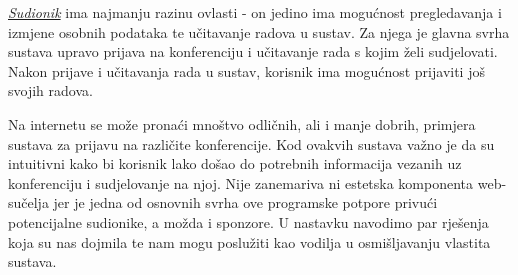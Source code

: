 		\underline{\textit{Sudionik}} ima najmanju razinu ovlasti - on jedino ima mogućnost pregledavanja i izmjene osobnih podataka te učitavanje radova u sustav. Za njega je glavna svrha sustava upravo prijava na konferenciju i učitavanje rada s kojim želi sudjelovati. Nakon prijave i učitavanja rada u sustav, korisnik ima mogućnost prijaviti još svojih radova.
		
		Na internetu se može pronaći mnoštvo odličnih, ali i manje dobrih, primjera sustava za prijavu na različite konferencije. Kod ovakvih sustava važno je da su intuitivni kako bi korisnik lako došao do potrebnih informacija vezanih uz konferenciju i sudjelovanje na njoj. Nije zanemariva ni estetska komponenta web-sučelja jer je jedna od osnovnih svrha ove programske potpore privući potencijalne sudionike, a možda i sponzore. U nastavku navodimo par rješenja koja su nas dojmila te nam mogu poslužiti kao vodilja u osmišljavanju vlastita sustava.
	
		\eject
		
	